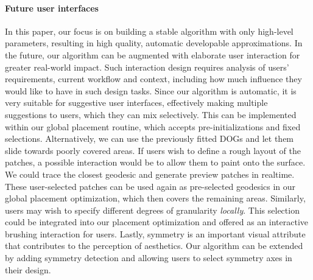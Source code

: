 \paragraph{Future user interfaces}

In this paper, our focus is on building a stable algorithm with only high-level parameters, resulting in high quality, automatic developable approximations. In the future, our algorithm can be augmented with elaborate user interaction for greater real-world impact. Such interaction design requires analysis of users’ requirements, current workflow and context, including how much influence they would like to have in such design tasks. 
Since our algorithm is automatic, it is very suitable for suggestive user interfaces, effectively making multiple suggestions to users, which they can mix selectively. This can be implemented within our global placement routine, which accepts pre-initializations and fixed selections. Alternatively, we can use the previously fitted DOGs and let them slide towards poorly covered areas. 
If users wish to define a rough layout of the patches, a possible interaction would be to allow them to paint onto the surface. We could trace the closest geodesic and generate preview patches in realtime. These user-selected patches can be used again as pre-selected geodesics in our global placement optimization, which then covers the remaining areas. 
Similarly, users may wish to specify different degrees of granularity \emph{locally}. This selection could be integrated into our placement optimization and offered as an interactive brushing interaction for users.
Lastly, symmetry is an important visual attribute that contributes to the perception of aesthetics. Our algorithm can be extended by adding symmetry detection and allowing users to select symmetry axes in their design. 

